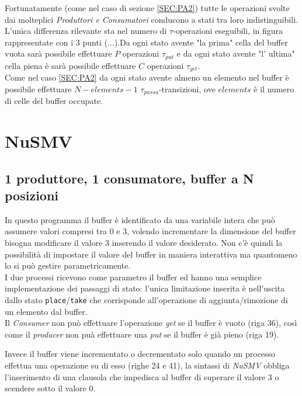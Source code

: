 \documentclass[a4paper]{article}
\begin{document}
Fortunatamente (come nel caso di sezione \ref{SEC:PA2}) tutte le operazioni svolte dai molteplici \textit{Produttori \textit{e} Consumatori} conducono a stati tra loro indistinguibili.\\
L'unica differenza rilevante sta nel numero di $\tau$-operazioni eseguibili, in figura rappresentate con i 3 punti ($...$).Da ogni stato avente "la prima" cella del buffer vuota sarà possibile effettuare $P$ operazioni $\tau_{put}$ e da ogni stato avente "l' ultima" cella piena è sarà possibile effettuare $C$ operazioni $\tau_{get}$.\\
Come nel caso \ref{SEC:PA2} da ogni stato avente almeno un elemento nel buffer è possibile effettuare $N - elements - 1$ $\tau_{passa}$-transizioni, ove $elements$ è il numero di celle del buffer occupate.\\
\newpage

\section{NuSMV}
\subsection{1 produttore, 1 consumatore, buffer a N posizioni}

In questo programma il buffer è identificato da una variabile intera che può assumere valori compresi tra 0 e 3, volendo incrementare la dimensione del buffer bisogna modificare il valore 3 inserendo il valore desiderato.
Non c'è quindi la possibilità di impostare il valore del buffer in maniera interattiva ma quantomeno lo si può gestire parametricamente.\\
I due processi ricevono come parametro il buffer ed hanno una semplice implementazione dei passaggi di stato: l'unica limitazione inserita è nell'uscita dallo stato \texttt{place}/\texttt{take} che corrisponde all'operazione di aggiunta/rimozione di un elemento dal buffer.\\
Il \textit{Consumer} non può effettuare l'operazione \textit{get} se il buffer è vuoto (riga 36), così come il \textit{producer} non puà effettuare una \textit{put} se il buffer è già pieno (riga 19).

Invece il buffer viene incrementato o decrementato solo quando un processo effettua una operazione su di esso (righe 24 e 41), la sintassi di \textit{NuSMV} obbliga l'inserimento di una clausola che impedisca al buffer di superare il valore 3 o scendere sotto il valore 0.
\newpage
\end{document}
